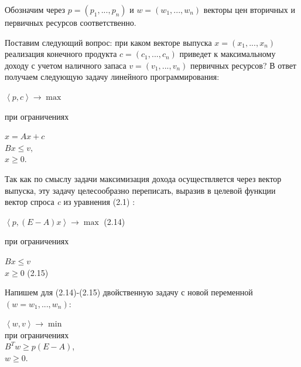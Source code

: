 \documentclass[12pt, 4paper]{book}
\begin{document}
{Обозначим через $p=(p_1,...,p_n)$ и $w=(w_1,...,w_n)$ векторы цен вторичных и первичных ресурсов соответственно.
\par

Поставим следующий вопрос: при каком векторе выпуска $x=(x_1,...,x_n)$ реализация конечного продукта $c=(c_1,...,c_n)$ приведет к максимальному доходу с учетом наличного запаса $v=(v_1,...,v_n)$ первичных ресурсов? В ответ получаем следующую задачу линейного программирования:
\begin{center}
$\left\langle p,c \right\rangle \rightarrow \max$
\end{center}
\begin{center}
при ограничениях
\end{center}
\begin{center}
$x = Ax + c$\\
$Bx \leq v,$\\
$x \geq 0.$
\end{center}
Так как по смыслу задачи максимизация дохода осуществляется через вектор выпуска, эту задачу целесообразно переписать, выразив в целевой функции вектор спроса \textit{c} из уравнения (2.1) :
\begin{center}
$\left\langle p,(E-A)x \right\rangle \rightarrow \max$ (2.14) 
\end{center}
\begin{center}
при ограничениях
\end{center}
\begin{center}
$Bx \leq v$\\
$x \geq 0$ (2.15)
\end{center}
Напишем для (2.14)-(2.15) двойственную задачу с новой переменной $(w=w_1,...,w_n)$:
\begin{center}
$\left\langle w,v\right\rangle \rightarrow \min$ \\
при ограничениях\\
$B^Tw \geq p(E-A)$,\\
$w \geq 0.$
\end{center}
\par

}
\end{document}
